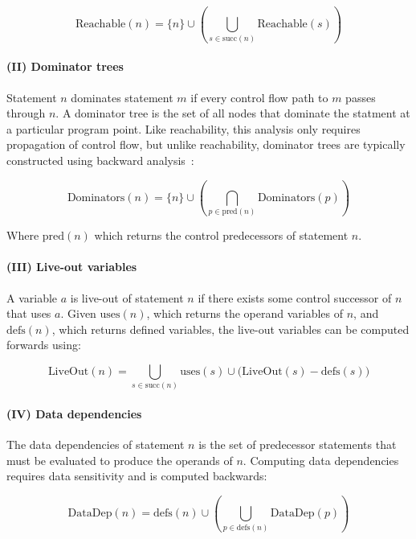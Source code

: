 \begin{equation}
  \text{Reachable}(n) = \{n\} \cup \left( \bigcup_{s \in \text{succ}(n)} \text{Reachable}(s) \right)
\end{equation}

\paragraph{(II) Dominator trees} Statement $n$ dominates statement $m$
if every control flow path to $m$ passes through $n$. A dominator tree
is the set of all nodes that dominate the statment at a particular
program point. Like reachability, this analysis only requires
propagation of control flow, but unlike reachability, dominator trees
are typically constructed using backward
analysis~\cite{Lengauer1979,Blazy2015}:

\begin{equation}
  \text{Dominators}(n) = \{n\} \cup \left( \bigcap_{p \in \text{pred}(n)} \text{Dominators}(p) \right)
\end{equation}

Where $\text{pred}(n)$ which returns the control predecessors of
statement $n$.

\paragraph{(III) Live-out variables} A variable $a$ is live-out of
statement $n$ if there exists some control successor of $n$ that uses
$a$. Given $\text{uses}(n)$, which returns the operand variables of
$n$, and $\text{defs}(n)$, which returns defined variables, the
live-out variables can be computed forwards using:

\begin{equation}
  \text{LiveOut}(n) = \bigcup_{s \in \text{succ}(n)} \text{uses}(s) \cup \big(  \text{LiveOut}(s) - \text{defs}(s) \big)
\end{equation}

\paragraph{(IV) Data dependencies} The data dependencies of statement
$n$ is the set of predecessor statements that must be evaluated to
produce the operands of $n$. Computing data dependencies requires data
sensitivity and is computed backwards:

\begin{equation}
  \text{DataDep}(n) = \text{defs}(n) \cup \left( \bigcup_{p \in \text{defs}(n)} \text{DataDep}(p) \right)
\end{equation}

